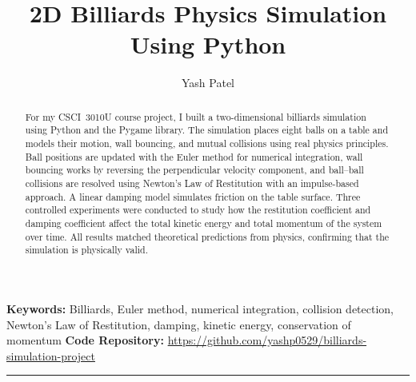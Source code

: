 \documentclass[12pt, letterpaper]{article}
\title{2D Billiards Physics Simulation Using Python}
\author{Yash Patel}
\affiliation{Ontario Tech University}
\begin{document}
\maketitle
\thispagestyle{firstpage}
\begin{abstract}
\noindent
For my CSCI~3010U course project, I built a two-dimensional billiards
simulation using Python and the Pygame library.
The simulation places eight balls on a table and models their motion,
wall bouncing, and mutual collisions using real physics principles.
Ball positions are updated with the Euler method for numerical
integration, wall bouncing works by reversing the perpendicular velocity
component, and ball--ball collisions are resolved using Newton's Law
of Restitution with an impulse-based approach.
A linear damping model simulates friction on the table surface.
Three controlled experiments were conducted to study how the restitution
coefficient and damping coefficient affect the total kinetic energy and
total momentum of the system over time.
All results matched theoretical predictions from physics, confirming
that the simulation is physically valid.
\end{abstract}
\noindent\textbf{Keywords:} Billiards, Euler method, numerical integration,
collision detection, Newton's Law of Restitution, damping,
kinetic energy, conservation of momentum
\medskip
\noindent\textbf{Code Repository:}
\url{https://github.com/yashp0529/billiards-simulation-project}
\medskip\hrule\medskip
\end{document}
